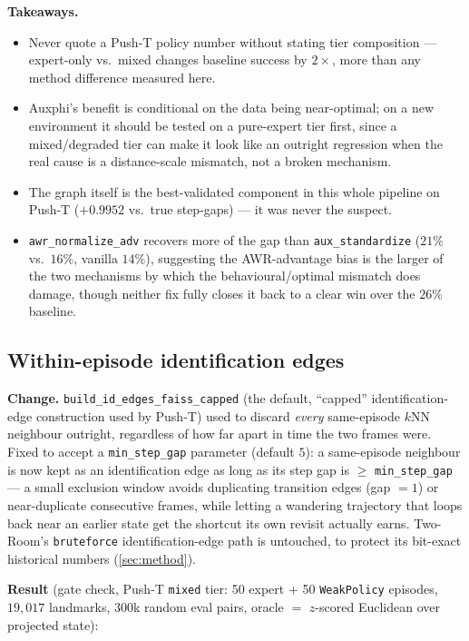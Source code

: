 \documentclass[11pt]{article}
\begin{document}
\textbf{Takeaways.}
\begin{itemize}[leftmargin=1.4em,itemsep=2pt]
\item Never quote a Push-T policy number without stating tier composition --- expert-only vs.\
mixed changes baseline success by $2\times$, more than any method difference measured here.
\item Auxphi's benefit is conditional on the data being near-optimal; on a new environment it
should be tested on a pure-expert tier first, since a mixed/degraded tier can make it look like
an outright regression when the real cause is a distance-scale mismatch, not a broken mechanism.
\item The graph itself is the best-validated component in this whole pipeline on Push-T
($+0.9952$ vs.\ true step-gaps) --- it was never the suspect.
\item \texttt{awr\_normalize\_adv} recovers more of the gap than \texttt{aux\_standardize}
($21\%$ vs.\ $16\%$, vanilla $14\%$), suggesting the AWR-advantage bias is the larger of the two
mechanisms by which the behavioural/optimal mismatch does damage, though neither fix fully
closes it back to a clear win over the $26\%$ baseline.
\end{itemize}

\subsection{Within-episode identification edges}
\label{sec:b5-within-ep}

\textbf{Change.} \texttt{build\_id\_edges\_faiss\_capped} (the default, ``capped''
identification-edge construction used by Push-T) used to discard \emph{every} same-episode
$k$NN neighbour outright, regardless of how far apart in time the two frames were. Fixed to
accept a \texttt{min\_step\_gap} parameter (default $5$): a same-episode neighbour is now kept
as an identification edge as long as its step gap is $\ge$ \texttt{min\_step\_gap} --- a small
exclusion window avoids duplicating transition edges (gap $=1$) or near-duplicate consecutive
frames, while letting a wandering trajectory that loops back near an earlier state get the
shortcut its own revisit actually earns. Two-Room's \texttt{bruteforce} identification-edge path
is untouched, to protect its bit-exact historical numbers (\cref{sec:method}).

\textbf{Result} (gate check, Push-T \texttt{mixed} tier: 50 expert $+$ 50 \texttt{WeakPolicy}
episodes, $19{,}017$ landmarks, $300$k random eval pairs, oracle $=$ $z$-scored Euclidean over
projected state):
\end{document}
